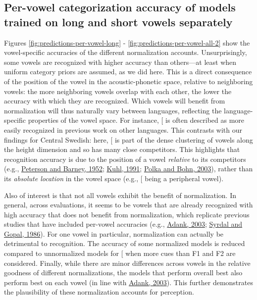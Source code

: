 \documentclass[utf8]{frontiers_suppmat} %
\begin{document}
\hypertarget{sec:accuracy-per-vowel}{%
\subsection{Per-vowel categorization accuracy of models trained on long and short vowels separately}\label{sec:accuracy-per-vowel}}

Figures \ref{fig:predictions-per-vowel-long} - \ref{fig:predictions-per-vowel-all-2} show the vowel-specific accuracies of the different normalization accounts. Unsurprisingly, some vowels are recognized with higher accuracy than others---at least when uniform category priors are assumed, as we did here. This is a direct consequence of the position of the vowel in the acoustic-phonetic space, relative to neighboring vowels: the more neighboring vowels overlap with each other, the lower the accuracy with which they are recognized. Which vowels will benefit from normalization will thus naturally vary between languages, reflecting the language-specific properties of the vowel space. For instance, {[}\ipatext{iː}{]} is often described as more easily recognized in previous work on other languages. This contrasts with our findings for Central Swedish: here, {[}\ipatext{iː}{]} is part of the dense clustering of vowels along the height dimension and so has many close competitors. This highlights that recognition accuracy is due to the position of a vowel \emph{relative} to its competitors (e.g., \protect\hyperlink{ref-Peterson1952}{Peterson and Barney, 1952}; \protect\hyperlink{ref-Kuhl1991}{Kuhl, 1991}; \protect\hyperlink{ref-Polka2003}{Polka and Bohn, 2003}), rather than its \emph{absolute location} in the vowel space (e.g., {[}\ipatext{iː}{]} being a peripheral vowel).

Also of interest is that not all vowels exhibit the benefit of normalization. In general, across evaluations, it seems to be vowels that are already recognized with high accuracy that does not benefit from normalization, which replicate previous studies that have included per-vowel accuracies (e.g., \protect\hyperlink{ref-adank2003}{Adank, 2003}; \protect\hyperlink{ref-Syrdal1986}{Syrdal and Gopal, 1986}). For one vowel in particular, normalization can actually be detrimental to recognition. The accuracy of some normalized models is reduced compared to unnormalized models for {[}\ipatext{ʉː}{]} when more cues than F1 and F2 are considered. Finally, while there are minor differences across vowels in the relative goodness of different normalizations, the models that perform overall best also perform best on each vowel (in line with \protect\hyperlink{ref-adank2003}{Adank, 2003}). This further demonstrates the plausibility of these normalization accounts for perception.
\end{document}
